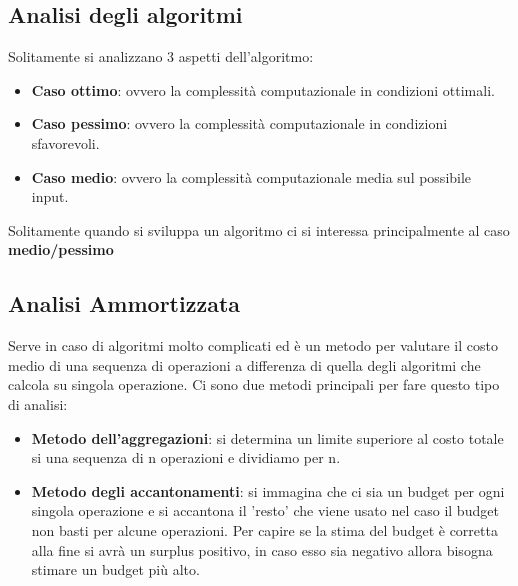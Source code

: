 \documentclass{article}
\begin{document}
\subsection{Analisi degli algoritmi} 
Solitamente si analizzano 3 aspetti dell'algoritmo:
\begin{itemize}
    \item \textbf{Caso ottimo}: ovvero la complessità computazionale in condizioni ottimali.
    \item \textbf{Caso pessimo}: ovvero la complessità computazionale in condizioni sfavorevoli.
    \item \textbf{Caso medio}: ovvero la complessità computazionale media sul possibile input.
\end{itemize}
Solitamente quando si sviluppa un algoritmo ci si interessa principalmente al caso \textbf{medio/pessimo} 

\subsection{Analisi Ammortizzata}
Serve in caso di algoritmi molto complicati  ed è un metodo per valutare il costo medio di una sequenza di operazioni a differenza di quella degli algoritmi che calcola su singola operazione. Ci sono due metodi principali per fare questo tipo di analisi:
\begin{itemize}
    \item \textbf{Metodo dell'aggregazioni}: si determina un limite superiore al costo totale si una sequenza di n operazioni e dividiamo per n.
    \item \textbf{Metodo degli accantonamenti}: si immagina che ci sia un budget per ogni singola operazione e si accantona il 'resto' che viene usato nel caso il budget non basti per alcune operazioni. Per capire se la stima del budget è corretta alla fine si avrà un surplus positivo, in caso esso sia negativo allora bisogna stimare un budget più alto.
\end{itemize}
\end{document}
